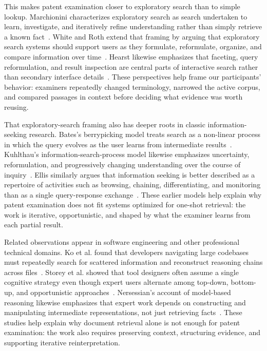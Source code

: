\documentclass[sigconf]{acmart}
\begin{document}
This makes patent examination closer to exploratory search than to simple
lookup. Marchionini characterizes exploratory search as search undertaken to
learn, investigate, and iteratively refine understanding rather than simply
retrieve a known fact~\cite{Marchionini2006}. White and Roth extend that
framing by arguing that exploratory search systems should support users as they
formulate, reformulate, organize, and compare information over time~\cite{White2009}.
Hearst likewise emphasizes that faceting, query reformulation, and result
inspection are central parts of interactive search rather than secondary
interface details~\cite{Hearst2009}. These perspectives help frame our
participants' behavior: examiners repeatedly changed terminology, narrowed the
active corpus, and compared passages in context before deciding what evidence
was worth reusing.

That exploratory-search framing also has deeper roots in classic information-
seeking research. Bates's berrypicking model treats search as a non-linear
process in which the query evolves as the user learns from intermediate
results~\cite{Bates1989}. Kuhlthau's information-search-process model likewise
emphasizes uncertainty, reformulation, and progressively changing
understanding over the course of inquiry~\cite{Kuhlthau1991}. Ellis similarly
argues that information seeking is better described as a repertoire of
activities such as browsing, chaining, differentiating, and monitoring than as
a single query-response exchange~\cite{Ellis1989}. These earlier models help
explain why patent examination does not fit systems optimized for one-shot
retrieval: the work is iterative, opportunistic, and shaped by what the
examiner learns from each partial result.

Related observations appear in software engineering and other professional
technical domains. Ko et al. found that developers navigating large codebases
must repeatedly search for scattered information and reconstruct reasoning
chains across files~\cite{Ko2006}. Storey et al. showed that tool designers
often assume a single cognitive strategy even though expert users alternate
among top-down, bottom-up, and opportunistic approaches~\cite{Storey1999}.
Nersessian's account of model-based reasoning likewise emphasizes that expert
work depends on constructing and manipulating intermediate representations, not
just retrieving facts~\cite{Nersessian2008}. These studies help explain why
document retrieval alone is not enough for patent examination: the work also
requires preserving context, structuring evidence, and supporting iterative
reinterpretation.
\end{document}
